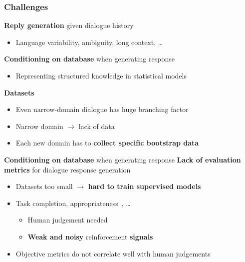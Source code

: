 \documentclass[10pt, compress,british,xcolor={svgnames,dvipsnames,x11names},trans]{beamer}
\begin{document}
\begin{frame}\frametitle{Challenges}
            {\bf \color{blue} Reply generation} given dialogue history
            \\
            \begin{itemize}
                \item Language variability, ambiguity, long context, \dots
            \end{itemize}
            {\bf \color{blue} Conditioning on database} when generating response 
            \\
            \begin{itemize}
                \item Representing structured knowledge in statistical models
            \end{itemize}
            {\bf \color{blue} Datasets}
            \\
            \begin{itemize}
                \item Even narrow-domain  dialogue has huge branching factor
                \item Narrow domain $\longrightarrow$ lack of data
                \item Each new domain has to {\bf collect specific bootstrap data}
            \end{itemize}
            \item {\bf \color{blue} Conditioning on database} when generating response 
            {\bf \color{blue} Lack of evaluation metrics} for dialogue response generation
            \\
            \begin{itemize}
                \item Datasets too small $\longrightarrow$ {\bf hard to train supervised models}
                \item Task completion, appropriateness~\cite{bohus2007error}, \dots 
                \begin{itemize}
                    \item Human judgement needed \item {\bf Weak and noisy} reinforcement {\bf signals}
                \end{itemize}
            \item Objective metrics 
                do not correlate well with human judgements
            \end{itemize}
\end{frame}
\end{document}
